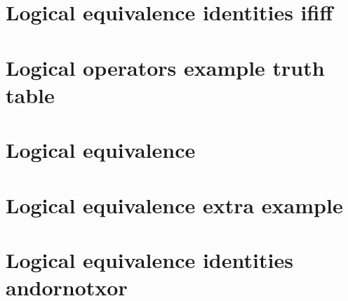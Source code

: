
\section*{Logical equivalence identities ififf}

\vfill
\section*{Logical operators example truth table}

\vfill
\section*{Logical equivalence}

\vfill
\section*{Logical equivalence extra example}

\vfill
\section*{Logical equivalence identities andornotxor}

\vfill
